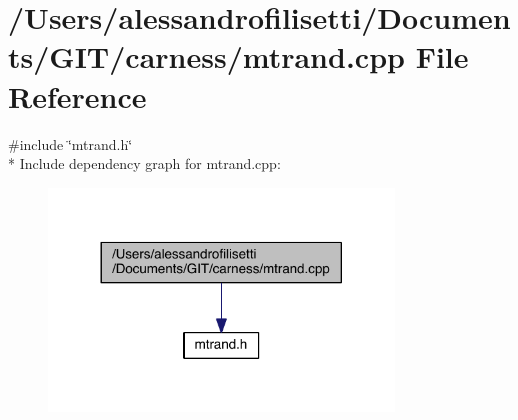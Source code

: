 \hypertarget{a00071}{\section{/\+Users/alessandrofilisetti/\+Documents/\+G\+I\+T/carness/mtrand.cpp File Reference}
\label{a00071}
}
{\ttfamily \#include \char`\"{}mtrand.\+h\char`\"{}}\\*
Include dependency graph for mtrand.\+cpp\+:\nopagebreak
\begin{figure}[H]
\begin{center}
\leavevmode
\includegraphics[width=260pt]{a00193}
\end{center}
\end{figure}

